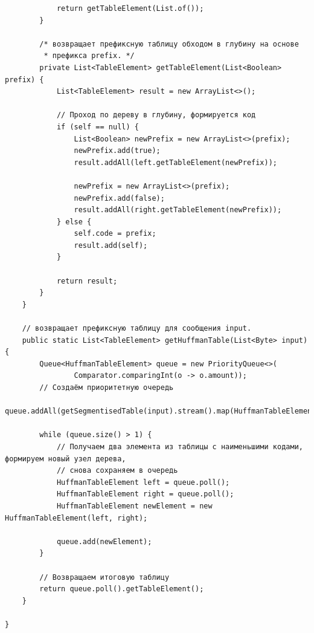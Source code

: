 \documentclass[a4paper,14pt]{extarticle}
\begin{document}
\begin{verbatim}
            return getTableElement(List.of());
        }

        /* возвращает префиксную таблицу обходом в глубину на основе
         * префикса prefix. */
        private List<TableElement> getTableElement(List<Boolean> prefix) {
            List<TableElement> result = new ArrayList<>();

            // Проход по дереву в глубину, формируется код
            if (self == null) {
                List<Boolean> newPrefix = new ArrayList<>(prefix);
                newPrefix.add(true);
                result.addAll(left.getTableElement(newPrefix));

                newPrefix = new ArrayList<>(prefix);
                newPrefix.add(false);
                result.addAll(right.getTableElement(newPrefix));
            } else {
                self.code = prefix;
                result.add(self);
            }

            return result;
        }
    }

    // возвращает префиксную таблицу для сообщения input.
    public static List<TableElement> getHuffmanTable(List<Byte> input) {
        Queue<HuffmanTableElement> queue = new PriorityQueue<>(
                Comparator.comparingInt(o -> o.amount));
        // Создаём приоритетную очередь
        queue.addAll(getSegmentisedTable(input).stream().map(HuffmanTableElement::new).collect(Collectors.toList()));

        while (queue.size() > 1) {
            // Получаем два элемента из таблицы с наименьшими кодами, формируем новый узел дерева,
            // снова сохраняем в очередь
            HuffmanTableElement left = queue.poll();
            HuffmanTableElement right = queue.poll();
            HuffmanTableElement newElement = new HuffmanTableElement(left, right);

            queue.add(newElement);
        }

        // Возвращаем итоговую таблицу
        return queue.poll().getTableElement();
    }

}
\end{verbatim}
\end{document}
